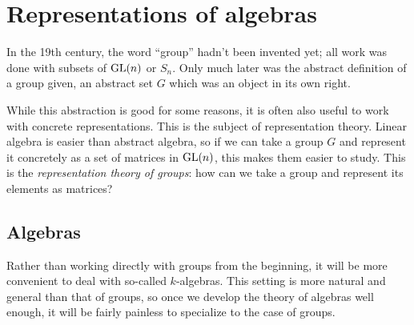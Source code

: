 \chapter{Representations of algebras}
\label{ch:representations_of_algebras}
In the 19th century, the word ``group'' hadn't been invented yet;
all work was done with subsets of $\operatorname{GL}(n)$ or $S_n$.
Only much later was the abstract definition of a group given,
an abstract set $G$ which was an object in its own right.

While this abstraction is good for some reasons,
it is often also useful to work with concrete representations.
This is the subject of representation theory.
Linear algebra is easier than abstract algebra,
so if we can take a group $G$ and represent it concretely
as a set of matrices in $\operatorname{GL}(n)$,
this makes them easier to study.
This is the \emph{representation theory of groups}:
how can we take a group and represent its elements as matrices?

\section{Algebras}
Rather than working directly with groups from the beginning,
it will be more convenient to deal with so-called $k$-algebras.
This setting is more natural and general than that of groups,
so once we develop the theory of algebras well enough,
it will be fairly painless to specialize to the case of groups.

